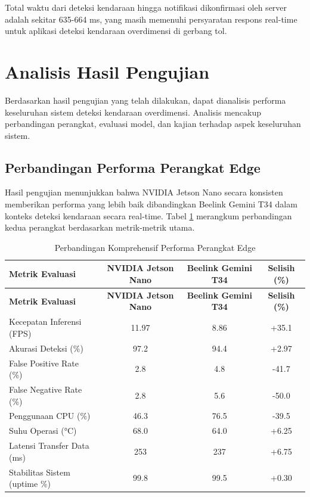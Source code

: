 Total waktu dari deteksi kendaraan hingga notifikasi dikonfirmasi oleh server adalah sekitar 635-664 ms, yang masih memenuhi persyaratan respons real-time untuk aplikasi deteksi kendaraan overdimensi di gerbang tol.

\section{Analisis Hasil Pengujian}
\label{sec:analisis}

Berdasarkan hasil pengujian yang telah dilakukan, dapat dianalisis performa keseluruhan sistem deteksi kendaraan overdimensi. Analisis mencakup perbandingan perangkat, evaluasi model, dan kajian terhadap aspek keseluruhan sistem.

\subsection{Perbandingan Performa Perangkat Edge}

Hasil pengujian menunjukkan bahwa NVIDIA Jetson Nano secara konsisten memberikan performa yang lebih baik dibandingkan Beelink Gemini T34 dalam konteks deteksi kendaraan secara real-time. Tabel \ref{tab:perangkat_comparison} merangkum perbandingan kedua perangkat berdasarkan metrik-metrik utama.

\begin{longtable}{|l|c|c|c|}
  \caption{Perbandingan Komprehensif Performa Perangkat Edge} \label{tab:perangkat_comparison} \\
  \hline
  \rowcolor[HTML]{C0C0C0}
  \textbf{Metrik Evaluasi} & \textbf{NVIDIA Jetson Nano} & \textbf{Beelink Gemini T34} & \textbf{Selisih (\%)} \\
  \hline
  \endfirsthead
  \hline
  \rowcolor[HTML]{C0C0C0}
  \textbf{Metrik Evaluasi} & \textbf{NVIDIA Jetson Nano} & \textbf{Beelink Gemini T34} & \textbf{Selisih (\%)} \\
  \hline
  Kecepatan Inferensi (FPS) & 11.97 & 8.86 & +35.1 \\
  \hline
  Akurasi Deteksi (\%) & 97.2 & 94.4 & +2.97 \\
  \hline
  False Positive Rate (\%) & 2.8 & 4.8 & -41.7 \\
  \hline
  False Negative Rate (\%) & 2.8 & 5.6 & -50.0 \\
  \hline
  Penggunaan CPU (\%) & 46.3 & 76.5 & -39.5 \\
  \hline
  Suhu Operasi (°C) & 68.0 & 64.0 & +6.25 \\
  \hline
  Latensi Transfer Data (ms) & 253 & 237 & +6.75 \\
  \hline
  Stabilitas Sistem (uptime \%) & 99.8 & 99.5 & +0.30 \\
  \hline
\end{longtable}

